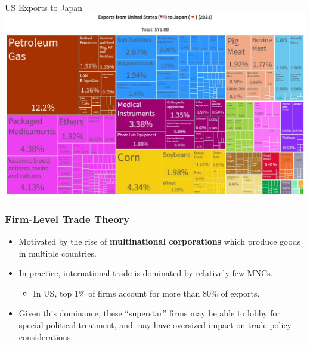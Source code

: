 \documentclass{beamer}
\begin{document}
\begin{frame}{\LARGE US Exports to Japan}
    \centering
\includegraphics[width=\textwidth,height=0.9\textheight,keepaspectratio]{US to Japan.JPG}
\end{frame}

\begin{frame} 
	\frametitle{\LARGE{Firm-Level Trade Theory}}
	\begin{itemize}
		\item Motivated by the rise of \textbf{multinational corporations} which produce goods in multiple countries. \pause
		\item In practice, international trade is dominated by relatively few MNCs.
		\begin{itemize}
			\item In US, top 1\% of firms account for more than 80\% of exports. \pause
		\end{itemize}
			\item Given this dominance, these ``superstar'' firms may be able to lobby for special political treatment, and may have oversized impact on trade policy considerations. 
	\end{itemize}
\end{frame}

\end{document}
